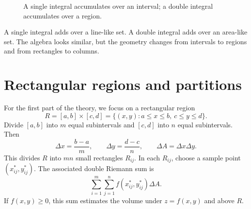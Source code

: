 \documentclass[11pt]{article}
\begin{document}
\begin{figure}[H]
\centering
\begin{minipage}{0.48\textwidth}
\centering
{}
\end{minipage}\hfill
\begin{minipage}{0.48\textwidth}
\centering
{}
\end{minipage}
\caption{A single integral accumulates over an interval; a double integral accumulates over a region.}
\end{figure}

\begin{notebox}
A single integral adds over a line-like set. A double integral adds over an area-like set. The algebra looks similar, but the geometry changes from intervals to regions and from rectangles to columns.
\end{notebox}

\section{Rectangular regions and partitions}

For the first part of the theory, we focus on a rectangular region
\[
R=[a,b]\times[c,d]=\{(x,y):a\le x\le b,\ c\le y\le d\}.
\]
Divide $[a,b]$ into $m$ equal subintervals and $[c,d]$ into $n$ equal subintervals. Then
\[
\Delta x=\frac{b-a}{m},\qquad \Delta y=\frac{d-c}{n},\qquad \Delta A=\Delta x\Delta y.
\]
This divides $R$ into $mn$ small rectangles $R_{ij}$. In each $R_{ij}$, choose a sample point $(x_{ij}^*,y_{ij}^*)$. The associated double Riemann sum is
\[
\sum_{i=1}^m\sum_{j=1}^n f(x_{ij}^*,y_{ij}^*)\Delta A.
\]
If $f(x,y)\ge 0$, this sum estimates the volume under $z=f(x,y)$ and above $R$.
\end{document}
